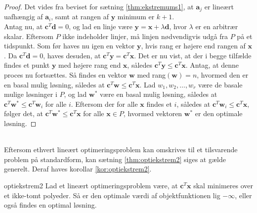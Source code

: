 \begin{proof}
Det vides fra beviset for sætning \ref{thm:ekstremums1}, at $\textbf{a}_j$ er lineært uafhængig af $\textbf{a}_i$, samt at rangen af $\textbf{y}$ minimum er $k + 1$. \\
Antag nu, at $\textbf{c}^T \textbf{d} = 0$, og lad en linje være $\textbf{y} = \textbf{x} + \lambda \textbf{d}$, hvor $ \lambda $ er en arbitrær skalar. 
Eftersom $P$ ikke indeholder linjer, må linjen nødvendigvis udgå fra $P$ på et tidspunkt. 
Som før haves nu igen en vektor $\textbf{y}$, hvis rang er højere end rangen af $\textbf{x}$. 
Da $\textbf{c}^T \textbf{d} = 0$, haves desuden, at $\textbf{c}^T \textbf{y} = \textbf{c}^T \textbf{x}$. 
Det er nu vist, at der i begge tilfælde findes et punkt $\textbf{y}$ med højere rang end $\textbf{x}$, således $\textbf{c}^T \textbf{y} \leq \textbf{c}^T \textbf{x}$. 
Antag, at denne proces nu fortsættes.
Så findes en vektor $\textbf{w}$ med rang$(\textbf{w})=n$, hvormed den er en basal mulig løsning, således at $\textbf{c}^T \textbf{w} \leq \textbf{c}^T \textbf{x}$. 
Lad $w_1, w_2, \ldots , w_r$ være de basale mulige løsninger i $P$, og lad $\textbf{w}^*$ være en basal mulig løsning, således at $\textbf{c}^T \textbf{w}^* \leq \textbf{c}^T \textbf{w}_i$ for alle $i$. 
Eftersom der for alle $\textbf{x}$ findes et $i$, således at $\textbf{c}^T \textbf{w}_i \leq \textbf{c}^T \textbf{x}$, følger det, at $\textbf{c}^T \textbf{w}^* \leq \textbf{c}^T \textbf{x}$ for alle $\textbf{x} \in P$, hvormed vektoren $\textbf{w}^*$ er den optimale løsning. 
\end{proof}\\
%
Eftersom ethvert lineært optimeringsproblem kan omskrives til et tilsvarende problem på standardform, kan sætning \ref{thm:optiekstrem2} siges at gælde generelt. 
Deraf haves korollar \ref{kor:optiekstrem2}. 
%
\begin{kor}{}{optiekstrem2}
Lad et lineært optimeringsproblem være, at $\textbf{c}^T \textbf{x}$ skal minimeres over et ikke-tomt polyeder.
Så er den optimale værdi af objektfunktionen lig $- \infty$, eller også findes en optimal løsning. 
\end{kor}
%
%